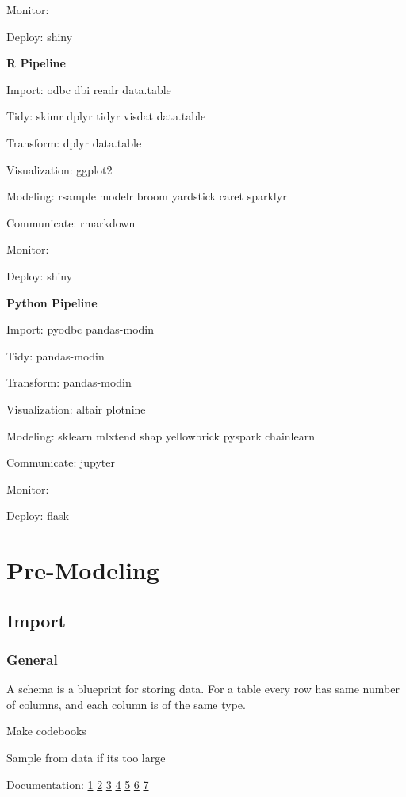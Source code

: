 \documentclass[]{book}
\begin{document}
Monitor:

Deploy: shiny

\textbf{R Pipeline}

Import: odbc dbi readr data.table

Tidy: skimr dplyr tidyr visdat data.table

Transform: dplyr data.table

Visualization: ggplot2

Modeling: rsample modelr broom yardstick caret sparklyr

Communicate: rmarkdown

Monitor:

Deploy: shiny

\textbf{Python Pipeline}

Import: pyodbc pandas-modin

Tidy: pandas-modin

Transform: pandas-modin

Visualization: altair plotnine

Modeling: sklearn mlxtend shap yellowbrick pyspark chainlearn

Communicate: jupyter

Monitor:

Deploy: flask

\hypertarget{pre-modeling-1}{%
\chapter{Pre-Modeling}\label{pre-modeling-1}}

\hypertarget{import}{%
\section{Import}\label{import}}

\hypertarget{general}{%
\subsection{General}\label{general}}

A schema is a blueprint for storing data. For a table every row has same number of columns, and each column is of the same type.

Make codebooks

Sample from data if its too large

Documentation: \href{http://databasenotetaker.com/}{1} \textbar{} \href{https://dataedo.com/}{2} \textbar{} \href{https://www.apexsql.com/sql-tools-doc.aspx}{3} \textbar{} \href{https://techwriter.me/best-practices-guide/documenting-databases.aspx}{4} \textbar{} \href{http://help.osf.io/m/bestpractices/l/618767-how-to-make-a-data-dictionary}{5} \textbar{} \href{https://dataedo.com/blog/different-types-of-tools-you-can-use-to-document-your-database}{6} \textbar{} \href{https://drawsql.app/\#features}{7}
\end{document}
